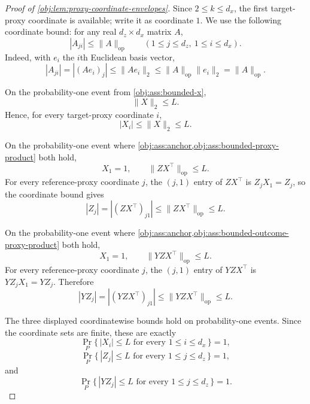 \begin{proof}[Proof of \cref{obj:lem:proxy-coordinate-envelopes}]
Since \(2\le k\le d_x\), the first target-proxy coordinate is available; write it as coordinate \(1\). We use the following coordinate bound: for any real \(d_z\times d_x\) matrix \(A\),
\[
|A_{j i}|\le \|A\|_{\mathrm{op}}
\qquad
(1\le j\le d_z,\ 1\le i\le d_x).
\]
Indeed, with \(e_i\) the \(i\)th Euclidean basis vector,
\[
|A_{j i}|
=
|(Ae_i)_j|
\le
\|Ae_i\|_2
\le
\|A\|_{\mathrm{op}}\|e_i\|_2
=
\|A\|_{\mathrm{op}} .
\] %

On the probability-one event from \cref{obj:ass:bounded-x},
\[
\|X\|_2\le L .
\]
Hence, for every target-proxy coordinate \(i\),
\[
|X_i|\le \|X\|_2\le L .
\] %

On the probability-one event where \cref{obj:ass:anchor,obj:ass:bounded-proxy-product} both hold,
\[
X_1=1,
\qquad
\|ZX^\top\|_{\mathrm{op}}\le L .
\]
For every reference-proxy coordinate \(j\), the \((j,1)\) entry of \(ZX^\top\) is \(Z_jX_1=Z_j\), so the coordinate bound gives
\[
|Z_j|
=
|(ZX^\top)_{j1}|
\le
\|ZX^\top\|_{\mathrm{op}}
\le L .
\] %

On the probability-one event where \cref{obj:ass:anchor,obj:ass:bounded-outcome-proxy-product} both hold,
\[
X_1=1,
\qquad
\|YZX^\top\|_{\mathrm{op}}\le L .
\]
For every reference-proxy coordinate \(j\), the \((j,1)\) entry of \(YZX^\top\) is \(YZ_jX_1=YZ_j\). Therefore
\[
|YZ_j|
=
|(YZX^\top)_{j1}|
\le
\|YZX^\top\|_{\mathrm{op}}
\le L .
\] %

The three displayed coordinatewise bounds hold on probability-one events. Since the coordinate sets are finite, these are exactly
\[
\Pr_P\{\,|X_i|\le L\text{ for every }1\le i\le d_x\,\}=1,
\]
\[
\Pr_P\{\,|Z_j|\le L\text{ for every }1\le j\le d_z\,\}=1,
\]
and
\[
\Pr_P\{\,|YZ_j|\le L\text{ for every }1\le j\le d_z\,\}=1 .
\] %
\end{proof}
